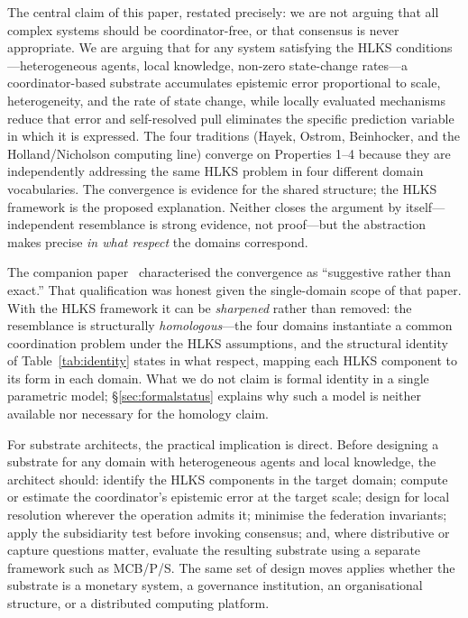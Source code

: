 \documentclass[11pt]{article}
\theoremstyle{definition}
\theoremstyle{plain}
\theoremstyle{plain}
\begin{document}
The central claim of this paper, restated precisely: we are not arguing that
all complex systems should be coordinator-free, or that consensus is never
appropriate. We are arguing that for any system satisfying the HLKS
conditions---heterogeneous agents, local knowledge, non-zero state-change
rates---a coordinator-based substrate accumulates epistemic error
proportional to scale, heterogeneity, and the rate of state change, while
locally evaluated mechanisms reduce that error and self-resolved pull eliminates
the specific prediction variable in which it is expressed. The four traditions
(Hayek, Ostrom, Beinhocker, and the Holland/Nicholson computing line)
converge on Properties 1--4 because they are independently addressing the same
HLKS problem in four different domain vocabularies. The convergence is evidence
for the shared structure; the HLKS framework is the proposed explanation. Neither
closes the argument by itself---independent resemblance is strong evidence, not
proof---but the abstraction makes precise \emph{in what respect} the domains
correspond.

The companion paper~\cite{nicholson2026} characterised the convergence as
``suggestive rather than exact.'' That qualification was honest given the
single-domain scope of that paper. With the HLKS framework it can be
\emph{sharpened} rather than removed: the resemblance is structurally
\emph{homologous}---the four domains instantiate a common coordination problem
under the HLKS assumptions, and the structural identity of
Table~\ref{tab:identity} states in what respect, mapping each HLKS component to its
form in each domain. What we do not claim is formal identity in a single
parametric model; \S\ref{sec:formalstatus} explains why such a model is neither
available nor necessary for the homology claim.

For substrate architects, the practical implication is direct. Before
designing a substrate for any domain with heterogeneous agents and local
knowledge, the architect should: identify the HLKS components in the target
domain; compute or estimate the coordinator's epistemic error at the target
scale; design for local resolution wherever the operation admits it;
minimise the federation invariants; apply the subsidiarity test before
invoking consensus; and, where distributive or capture questions matter, evaluate
the resulting substrate using a separate framework such as MCB/P/S. The same set of
design moves applies whether the substrate is a
monetary system, a governance institution, an organisational structure, or
a distributed computing platform.
\end{document}
